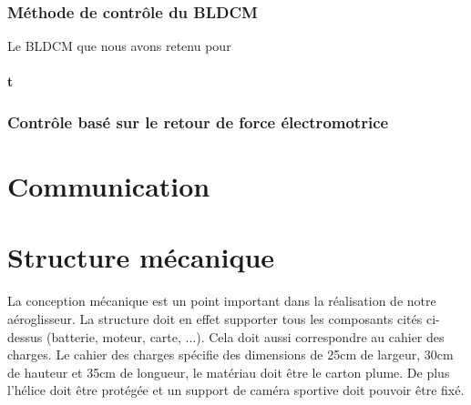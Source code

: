 \documentclass[a4paper,12pt]{book}
\begin{document}
				 \subsection{Méthode de contrôle du BLDCM}
				 
				 Le BLDCM que nous avons retenu pour 
				 
				 	\subsubsection{t}
				 
				 
				 
				 
				 
				 
				 
				 
				 

			
			\subsection{Contrôle basé sur le retour de force électromotrice}
	\chapter{Communication}
		
	\chapter{Structure mécanique}
	La conception mécanique est un point important dans la réalisation de notre aéroglisseur. La structure doit en effet supporter tous les composants cités ci-dessus (batterie, moteur, carte, ...). Cela doit aussi correspondre au cahier des charges. Le cahier des charges spécifie des dimensions de 25cm de largeur, 30cm de hauteur et 35cm de longueur, le matériau doit être le carton plume. De plus l'hélice doit être protégée et un support de caméra sportive doit pouvoir être fixé. 
\end{document}
